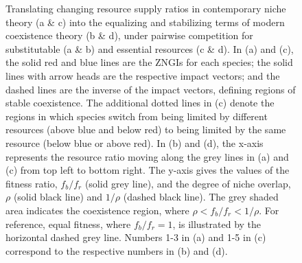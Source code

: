 \newpage
\begin{figure}[h!]
\centering
{}
\caption[Translating changing resource supply ratios in contemporary niche theory into the equalizing and stabilizing terms of modern coexistence theory, under pairwise competition for substitutable and essential resources.]
	{\hspace{1mm}Translating changing resource supply ratios in contemporary niche theory (a \& c) into the equalizing and stabilizing terms of modern coexistence theory (b \& d), under pairwise competition for substitutable (a \& b) and essential resources (c \& d). In (a) and (c), the solid red and blue lines are the ZNGIs for each species; the solid lines with arrow heads are the respective impact vectors; and the dashed lines are the inverse of the impact vectors, defining regions of stable coexistence. The additional dotted lines in (c) denote the regions in which species switch from being limited by different resources (above blue and below red) to being limited by the same resource (below blue or above red). In (b) and (d), the x-axis represents the resource ratio moving along the grey lines in (a) and (c) from top left to bottom right. The y-axis gives the values of the fitness ratio, $f_{b}/f_{r}$ (solid grey line), and the degree of niche overlap, $\rho$ (solid black line) and $1/\rho$ (dashed black line). The grey shaded area indicates the coexistence region, where $\rho<f_{b}/f_{r}<1/\rho$. For reference, equal fitness, where $f_{b}/f_{r}=1$, is illustrated by the horizontal dashed grey line. Numbers 1-3 in (a) and 1-5 in (c) correspond to the respective numbers in (b) and (d).}
\label{fig:supply-ms-fig}
\end{figure}



